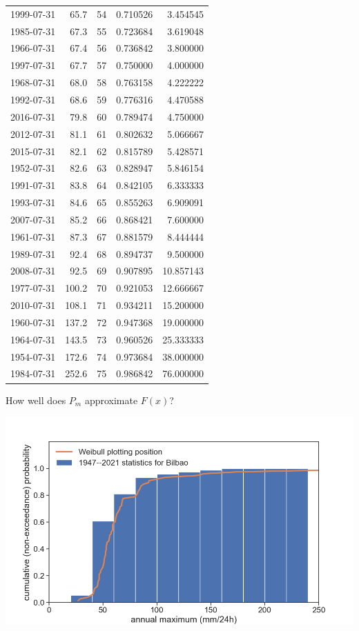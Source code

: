 \documentclass[
  letterpaper,
  DIV=11,
  numbers=noendperiod]{scrreprt}
\begin{document}
\begin{tabular}{lrrrr}
1999-07-31 &   65.7 &  54 &  0.710526 &   3.454545 \\
1985-07-31 &   67.3 &  55 &  0.723684 &   3.619048 \\
1966-07-31 &   67.4 &  56 &  0.736842 &   3.800000 \\
1997-07-31 &   67.7 &  57 &  0.750000 &   4.000000 \\
1968-07-31 &   68.0 &  58 &  0.763158 &   4.222222 \\
1992-07-31 &   68.6 &  59 &  0.776316 &   4.470588 \\
2016-07-31 &   79.8 &  60 &  0.789474 &   4.750000 \\
2012-07-31 &   81.1 &  61 &  0.802632 &   5.066667 \\
2015-07-31 &   82.1 &  62 &  0.815789 &   5.428571 \\
1952-07-31 &   82.6 &  63 &  0.828947 &   5.846154 \\
1991-07-31 &   83.8 &  64 &  0.842105 &   6.333333 \\
1993-07-31 &   84.6 &  65 &  0.855263 &   6.909091 \\
2007-07-31 &   85.2 &  66 &  0.868421 &   7.600000 \\
1961-07-31 &   87.3 &  67 &  0.881579 &   8.444444 \\
1989-07-31 &   92.4 &  68 &  0.894737 &   9.500000 \\
2008-07-31 &   92.5 &  69 &  0.907895 &  10.857143 \\
1977-07-31 &  100.2 &  70 &  0.921053 &  12.666667 \\
2010-07-31 &  108.1 &  71 &  0.934211 &  15.200000 \\
1960-07-31 &  137.2 &  72 &  0.947368 &  19.000000 \\
1964-07-31 &  143.5 &  73 &  0.960526 &  25.333333 \\
1954-07-31 &  172.6 &  74 &  0.973684 &  38.000000 \\
1984-07-31 &  252.6 &  75 &  0.986842 &  76.000000 \\
\bottomrule
\end{tabular}

How well does \(P_m\) approximate \(F(x)\)?

\includegraphics{archive/figures/weibull_plotting_position.png}
\end{document}
